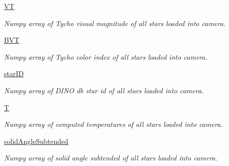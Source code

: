 \begin{DoxyCompactItemize}
\mbox{\label{classcamera_1_1camera_ad86d285acdbdb42eadefd09edb7b809d}} 
\hyperlink{classcamera_1_1camera_ad86d285acdbdb42eadefd09edb7b809d}{VT}
\begin{DoxyCompactList}\small\item\em Numpy array of Tycho visual magnitude of all stars loaded into camera. \end{DoxyCompactList}\item 
\mbox{\label{classcamera_1_1camera_aee78a40a55af27c034acd3391bc9daa0}} 
\hyperlink{classcamera_1_1camera_aee78a40a55af27c034acd3391bc9daa0}{B\+VT}
\begin{DoxyCompactList}\small\item\em Numpy array of Tycho color index of all stars loaded into camera. \end{DoxyCompactList}\item 
\mbox{\label{classcamera_1_1camera_ad3765c578f014ad94a30b1a25038464a}} 
\hyperlink{classcamera_1_1camera_ad3765c578f014ad94a30b1a25038464a}{star\+ID}
\begin{DoxyCompactList}\small\item\em Numpy array of D\+I\+NO db star id of all stars loaded into camera. \end{DoxyCompactList}\item 
\mbox{\label{classcamera_1_1camera_a0699ada0f62c01c7d2e595bb6eb189f9}} 
\hyperlink{classcamera_1_1camera_a0699ada0f62c01c7d2e595bb6eb189f9}{T}
\begin{DoxyCompactList}\small\item\em Numpy array of computed temperatures of all stars loaded into camera. \end{DoxyCompactList}\item 
\mbox{\label{classcamera_1_1camera_ac88a64236a0cf2e01f23ae64081ad2d0}} 
\hyperlink{classcamera_1_1camera_ac88a64236a0cf2e01f23ae64081ad2d0}{solid\+Angle\+Subtended}
\begin{DoxyCompactList}\small\item\em Numpy array of solid angle subtended of all stars loaded into camera. \end{DoxyCompactList}\item 
\mbox{\label{classcamera_1_1camera_ab98b2a4012762c8cb79033b97abcae77}} 

\end{DoxyCompactItemize}
